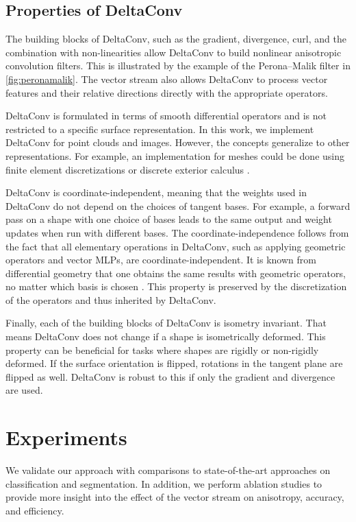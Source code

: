 \documentclass[acmtog, authorversion]{acmart}
\begin{document}
\subsection{Properties of DeltaConv}
The building blocks of DeltaConv, such as the gradient, divergence, curl, and the combination with non-linearities allow DeltaConv to build nonlinear anisotropic convolution filters. This is illustrated by the example of the Perona--Malik filter in \autoref{fig:peronamalik}.
The vector stream also allows DeltaConv to process vector features and their relative directions directly with the appropriate operators.

DeltaConv is formulated in terms of smooth differential operators and is not restricted to a specific surface representation. In this work, we implement DeltaConv for point clouds and images. However, the concepts generalize to other representations. For example, an implementation for meshes could be done using finite element discretizations \cite{Brandt2017} or discrete exterior calculus \cite{Crane2013DGP}.

DeltaConv is coordinate-independent, meaning that the weights used in DeltaConv do not depend on the choices of tangent bases. For example, a forward pass on a shape with one choice of bases leads to the same output and weight updates when run with different bases.
The coordinate-independence follows from the fact that all elementary operations in DeltaConv, such as applying geometric operators and vector MLPs, are coordinate-independent. It is known from differential geometry that one obtains the same results with geometric operators, no matter which basis is chosen \cite{o1983semi}. This property is preserved by the discretization of the operators and thus inherited by DeltaConv.

Finally, each of the building blocks of DeltaConv is isometry invariant. That means DeltaConv does not change if a shape is isometrically deformed. This property can be beneficial for tasks where shapes are rigidly or non-rigidly deformed. If the surface orientation is flipped, rotations in the tangent plane are flipped as well. DeltaConv is robust to this if only the gradient and divergence are used.
 \section{Experiments}
We validate our approach with comparisons to state-of-the-art approaches on classification and segmentation. In addition, we perform ablation studies to provide more insight into the effect of the vector stream on anisotropy, accuracy, and efficiency.
\end{document}
